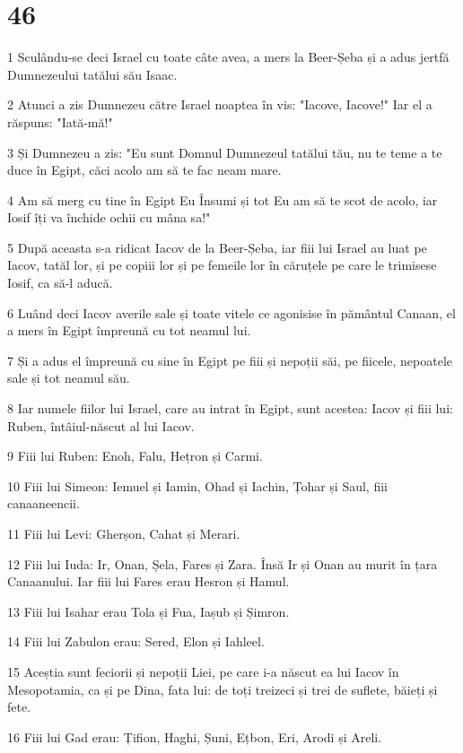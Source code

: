 \chapter{46}

\par 1 Sculându-se deci Israel cu toate câte avea, a mers la Beer-Șeba și a adus jertfă Dumnezeului tatălui său Isaac.
\par 2 Atunci a zis Dumnezeu către Israel noaptea în vis: "Iacove, Iacove!" Iar el a răspuns: "Iată-mă!"
\par 3 Și Dumnezeu a zis: "Eu sunt Domnul Dumnezeul tatălui tău, nu te teme a te duce în Egipt, căci acolo am să te fac neam mare.
\par 4 Am să merg cu tine în Egipt Eu Însumi și tot Eu am să te scot de acolo, iar Iosif îți va închide ochii cu mâna sa!"
\par 5 După aceasta s-a ridicat Iacov de la Beer-Șeba, iar fiii lui Israel au luat pe Iacov, tatăl lor, și pe copiii lor și pe femeile lor în căruțele pe care le trimisese Iosif, ca să-l aducă.
\par 6 Luând deci Iacov averile sale și toate vitele ce agonisise în pământul Canaan, el a mers în Egipt împreună cu tot neamul lui.
\par 7 Și a adus el împreună cu sine în Egipt pe fiii și nepoții săi, pe fiicele, nepoatele sale și tot neamul său.
\par 8 Iar numele fiilor lui Israel, care au intrat în Egipt, sunt acestea: Iacov și fiii lui: Ruben, întâiul-născut al lui Iacov.
\par 9 Fiii lui Ruben: Enoh, Falu, Hețron și Carmi.
\par 10 Fiii lui Simeon: Iemuel și Iamin, Ohad și Iachin, Țohar și Saul, fiii canaaneencii.
\par 11 Fiii lui Levi: Gherșon, Cahat și Merari.
\par 12 Fiii lui Iuda: Ir, Onan, Șela, Fares și Zara. Însă Ir și Onan au murit în țara Canaanului. Iar fiii lui Fares erau Hesron și Hamul.
\par 13 Fiii lui Isahar erau Tola și Fua, Iașub și Șimron.
\par 14 Fiii lui Zabulon erau: Sered, Elon și Iahleel.
\par 15 Aceștia sunt feciorii și nepoții Liei, pe care i-a născut ea lui Iacov în Mesopotamia, ca și pe Dina, fata lui: de toți treizeci și trei de suflete, băieți și fete.
\par 16 Fiii lui Gad erau: Țifion, Haghi, Șuni, Ețbon, Eri, Arodi și Areli.
